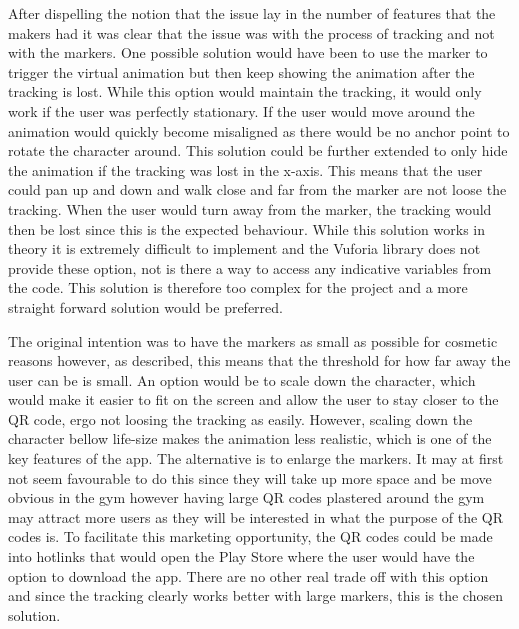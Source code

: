 \documentclass{l4proj}
\begin{document}
After dispelling the notion that the issue lay in the number of features that the makers had it was clear that the issue was with the process of tracking and not with the markers. One possible solution would have been to use the marker to trigger the virtual animation but then keep showing the animation after the tracking is lost. While this option would maintain the tracking, it would only work if the user was perfectly stationary. If the user would move around the animation would quickly become misaligned as there would be no anchor point to rotate the character around. This solution could be further extended to only hide the animation if the tracking was lost in the x-axis. This means that the user could pan up and down and walk close and far from the marker are not loose the tracking. When the user would turn away from the marker, the tracking would then be lost since this is the expected behaviour. While this solution works in theory it is extremely difficult to implement and the Vuforia library does not provide these option, not is there a way to access any indicative variables from the code. This solution is therefore too complex for the project and a more straight forward solution would be preferred. 

The original intention was to have the markers as small as possible for cosmetic reasons however, as described, this means that the threshold for how far away the user can be is small. An option would be to scale down the character, which would make it  easier to fit on the screen and allow the user to stay closer to the QR code, ergo not loosing the tracking as easily. However, scaling down the character bellow life-size makes the animation less realistic, which is one of the key features of the app. The alternative is to enlarge the markers. It may at first not seem favourable to do this since they will take up more space and be move obvious in the gym however having large QR codes plastered around the gym may attract more users as they will be interested in what the purpose of the QR codes is. To facilitate this marketing opportunity, the QR codes could be made into hotlinks that would open the Play Store where the user would have the option to download the app. There are no other real trade off with this option and since the tracking clearly works better with large markers, this is the chosen solution.
\end{document}
